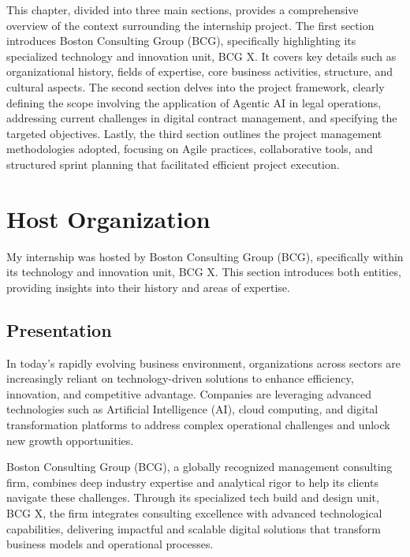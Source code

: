 This chapter, divided into three main sections, provides a comprehensive overview of the context surrounding the internship project. The first section introduces Boston Consulting Group (BCG), specifically highlighting its specialized technology and innovation unit, BCG X. It covers key details such as organizational history, fields of expertise, core business activities, structure, and cultural aspects. The second section delves into the project framework, clearly defining the scope involving the application of Agentic AI in legal operations, addressing current challenges in digital contract management, and specifying the targeted objectives. Lastly, the third section outlines the project management methodologies adopted, focusing on Agile practices, collaborative tools, and structured sprint planning that facilitated efficient project execution.

\newpage
{}

\section{Host Organization}

My internship was hosted by Boston Consulting Group (BCG), specifically within its technology and innovation unit, BCG X. This section introduces both entities, providing insights into their history and areas of expertise.

\subsection{Presentation}
In today's rapidly evolving business environment, organizations across sectors are increasingly reliant on technology-driven solutions to enhance efficiency, innovation, and competitive advantage. Companies are leveraging advanced technologies such as Artificial Intelligence (AI), cloud computing, and digital transformation platforms to address complex operational challenges and unlock new growth opportunities.\mynewline

Boston Consulting Group (BCG), a globally recognized management consulting firm, combines deep industry expertise and analytical rigor to help its clients navigate these challenges. Through its specialized tech build and design unit, BCG X, the firm integrates consulting excellence with advanced technological capabilities, delivering impactful and scalable digital solutions that transform business models and operational processes.\mynewline

